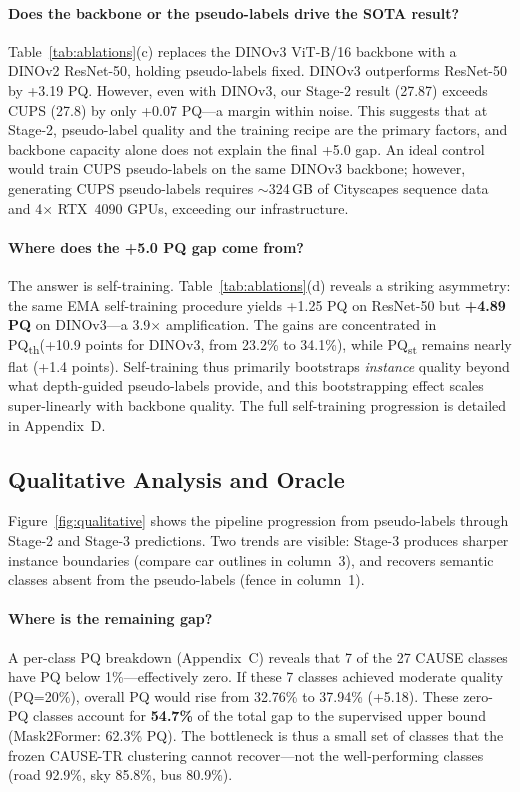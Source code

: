 \documentclass{bmvc2k}
\newcommand{\pqt}{PQ\textsubscript{th}\xspace}
\newcommand{\pqs}{PQ\textsubscript{st}\xspace}
\begin{document}
\paragraph{Does the backbone or the pseudo-labels drive the SOTA result?}
Table~\ref{tab:ablations}(c) replaces the DINOv3 ViT-B/16 backbone with a DINOv2 ResNet-50, holding pseudo-labels fixed. DINOv3 outperforms ResNet-50 by +3.19 PQ. However, even with DINOv3, our Stage-2 result (27.87) exceeds CUPS (27.8) by only +0.07 PQ---a margin within noise. This suggests that at Stage-2, pseudo-label quality and the training recipe are the primary factors, and backbone capacity alone does not explain the final +5.0 gap. An ideal control would train CUPS pseudo-labels on the same DINOv3 backbone; however, generating CUPS pseudo-labels requires ${\sim}$324\,GB of Cityscapes sequence data and 4$\times$ RTX~4090 GPUs, exceeding our infrastructure.

\paragraph{Where does the +5.0 PQ gap come from?}
The answer is self-training. Table~\ref{tab:ablations}(d) reveals a striking asymmetry: the same EMA self-training procedure yields +1.25 PQ on ResNet-50 but \textbf{+4.89 PQ} on DINOv3---a 3.9$\times$ amplification. The gains are concentrated in \pqt (+10.9 points for DINOv3, from 23.2\% to 34.1\%), while \pqs remains nearly flat (+1.4 points). Self-training thus primarily bootstraps \emph{instance} quality beyond what depth-guided pseudo-labels provide, and this bootstrapping effect scales super-linearly with backbone quality. The full self-training progression is detailed in Appendix~D.

\subsection{Qualitative Analysis and Oracle}

Figure~\ref{fig:qualitative} shows the pipeline progression from pseudo-labels through Stage-2 and Stage-3 predictions. Two trends are visible: Stage-3 produces sharper instance boundaries (compare car outlines in column~3), and recovers semantic classes absent from the pseudo-labels (fence in column~1).

\paragraph{Where is the remaining gap?}
A per-class PQ breakdown (Appendix~C) reveals that 7 of the 27 CAUSE classes have PQ below 1\%---effectively zero. If these 7 classes achieved moderate quality (PQ=20\%), overall PQ would rise from 32.76\% to 37.94\% (+5.18). These zero-PQ classes account for \textbf{54.7\%} of the total gap to the supervised upper bound (Mask2Former: 62.3\% PQ). The bottleneck is thus a small set of classes that the frozen CAUSE-TR clustering cannot recover---not the well-performing classes (road 92.9\%, sky 85.8\%, bus 80.9\%).
\end{document}
